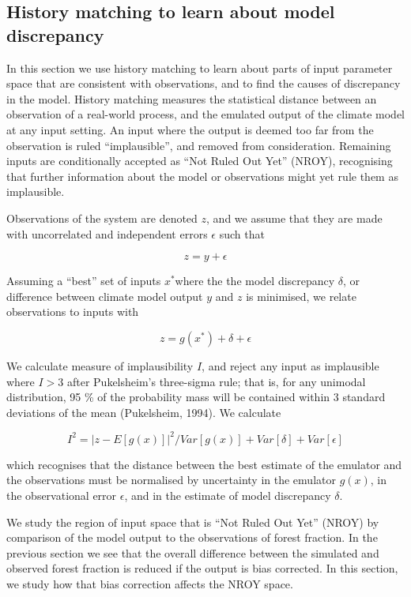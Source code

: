 \documentclass[gmd, manuscript]{copernicus}
\begin{document}
\subsection{History matching to learn about model discrepancy}\label{ssec:history_matching}
In this section we use history matching to learn about parts of input parameter space that are consistent with observations, and to find the causes of discrepancy in the model. History matching measures the statistical distance between an observation of a real-world process, and the emulated output of the climate model at any input setting. An input where the output is deemed too far from the observation is ruled ``implausible'', and removed from consideration. Remaining inputs are conditionally accepted as ``Not Ruled Out Yet'' (NROY), recognising that further information about the model or observations might yet rule them as implausible.

Observations of the system are denoted $z$, and we assume that they are made with uncorrelated and independent errors $\epsilon$  such that

\begin{equation}
z = y+\epsilon
\end{equation}

Assuming a ``best'' set of inputs $x^*$where the the model discrepancy $\delta$, or difference between climate model output $y$ and $z$ is minimised, we relate observations to inputs with 

\begin{equation}
z = g(x^*) + \delta + \epsilon 
\end{equation}

We calculate measure of implausibility $I$, and reject any input as implausible where $I >3$ after Pukelsheim's three-sigma rule; that is, for any unimodal distribution, 95 \% of the probability mass will be contained within 3 standard deviations of the mean (Pukelsheim, 1994). We calculate

\begin{equation}
I^{2} = {\lvert  z - E[g(x)]\rvert}^{2} /  Var[g(x)] + Var[\delta] +  Var[\epsilon]
\end{equation}

which recognises that the distance between the best estimate of the emulator and the observations must be normalised by uncertainty in the emulator $g(x)$, in the observational error $\epsilon$, and in the estimate of model discrepancy $\delta$. 

We study the region of input space that is ``Not Ruled Out Yet'' (NROY) by comparison of the model output to the observations of forest fraction. In the previous section we see that the overall difference between the simulated and observed forest fraction is reduced if the output is bias corrected. In this section, we study how that bias correction affects the NROY space.
\end{document}
